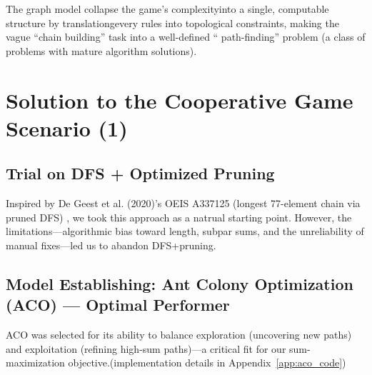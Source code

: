 \documentclass[twocolumn, a4paper]{article}
\begin{document}
The graph model collapse the game's complexityinto a single, computable structure by translationgevery rules into topological constraints, making the vague ``chain building'' task into a well-defined `` path-finding'' problem (a class of problems with mature algorithm solutions).


\section{Solution to the Cooperative Game Scenario (1)}
\subsection{Trial on DFS + Optimized Pruning}
Inspired by De Geest et al. (2020)'s OEIS A337125 (longest 77-element chain via pruned DFS) \textsuperscript{\cite{degeest2020a337125}}, we took this approach as a natrual starting point. However, the limitations---algorithmic bias toward length, subpar sums, and the unreliability of manual fixes---led us to abandon DFS+pruning.


\subsection{Model Establishing: Ant Colony Optimization (ACO) --- Optimal Performer}
ACO was selected for its ability to balance exploration (uncovering new paths) and exploitation (refining high-sum paths)---a critical fit for our sum-maximization objective.(implementation details in Appendix~\ref{app:aco_code})
\end{document}
